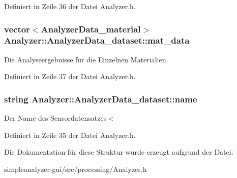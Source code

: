 Definiert in Zeile 36 der Datei Analyzer.\-h.

\hypertarget{structAnalyzer_1_1AnalyzerData__dataset_a25d0189c93bc0da58f778750edb2a2b9}{
\subsubsection[{mat\-\_\-data}]{\setlength{\rightskip}{0pt plus 5cm}vector$<${\bf Analyzer\-Data\-\_\-material}$>$ Analyzer\-::\-Analyzer\-Data\-\_\-dataset\-::mat\-\_\-data}}\label{structAnalyzer_1_1AnalyzerData__dataset_a25d0189c93bc0da58f778750edb2a2b9}
Die Analyseergebnisse für die Einzelnen Materialien. 

Definiert in Zeile 37 der Datei Analyzer.\-h.

\hypertarget{structAnalyzer_1_1AnalyzerData__dataset_a53f3c1896123de4dc00f01e593d5f70d}{
\subsubsection[{name}]{\setlength{\rightskip}{0pt plus 5cm}string Analyzer\-::\-Analyzer\-Data\-\_\-dataset\-::name}}\label{structAnalyzer_1_1AnalyzerData__dataset_a53f3c1896123de4dc00f01e593d5f70d}
Der Name des Sensordatensatzes$<$ 

Definiert in Zeile 35 der Datei Analyzer.\-h.



Die Dokumentation für diese Struktur wurde erzeugt aufgrund der Datei\-:\begin{DoxyCompactItemize}
\item 
simpleanalyzer-\/gui/src/processing/Analyzer.\-h\end{DoxyCompactItemize}
